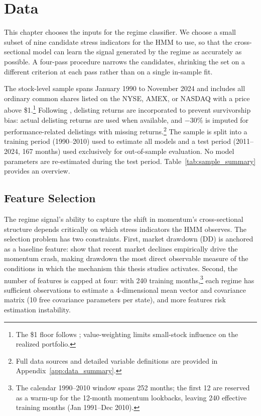 
\clearpage
\section{Data}\label{sec:data}

This chapter chooses the inputs for the regime classifier. We choose a small subset of nine candidate stress indicators for the HMM to use, so that the cross-sectional model can learn the signal generated by the regime as accurately as possible. A four-pass procedure narrows the candidates, shrinking the set on a different criterion at each pass rather than on a single in-sample fit.

The stock-level sample spans January 1990 to November 2024 and includes all ordinary common shares listed on the NYSE, AMEX, or NASDAQ with a price above \$1.\footnote{The \$1 floor follows \citet{Gu2020}; value-weighting limits small-stock influence on the realized portfolio.} Following \citet{Shumway1997}, delisting returns are incorporated to prevent survivorship bias: actual delisting returns are used when available, and $-30\%$ is imputed for performance-related delistings with missing returns.\footnote{Full data sources and detailed variable definitions are provided in Appendix~\ref{app:data_summary}.} The sample is split into a training period (1990--2010) used to estimate all models and a test period (2011--2024, 167 months) used exclusively for out-of-sample evaluation. No model parameters are re-estimated during the test period. Table~\ref{tab:sample_summary} provides an overview.




\subsection{Feature Selection}\label{sec:feature_selection}

The regime signal's ability to capture the shift in momentum's cross-sectional structure depends critically on which stress indicators the HMM observes. The selection problem has two constraints. First, market drawdown (DD) is anchored as a baseline feature: \citet{DanielMoskowitz2016} show that recent market declines empirically drive the momentum crash, making drawdown the most direct observable measure of the conditions in which the mechanism this thesis studies activates. Second, the number of features is capped at four: with 240 training months,\footnote{The calendar 1990--2010 window spans 252 months; the first 12 are reserved as a warm-up for the 12-month momentum lookbacks, leaving 240 effective training months (Jan 1991--Dec 2010).} each regime has sufficient observations to estimate a 4-dimensional mean vector and covariance matrix (10 free covariance parameters per state), and more features risk estimation instability.

